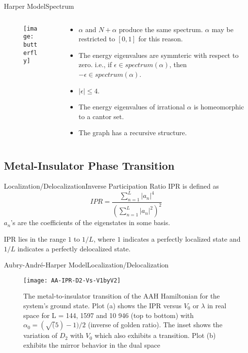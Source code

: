 \documentclass{beamer}
\begin{document}
\begin{frame}{Harper Model}{Spectrum}
\begin{columns}
 \begin{column}{0.35\textwidth}
  \begin{figure}[h]
    \centering
    \texttt{[image: butterfly]}
  \end{figure} 
 \end{column}
 \begin{column}{0.65\textwidth}
  \begin{itemize}\small
  \item $\alpha$ and $N+\alpha$ produce the same spectrum. $\alpha$ may be restricted to $[0,1]$ for this reason.
  \item The energy eigenvalues are symmteric with respect to zero. i.e., if $\epsilon \in spectrum(\alpha)$, then $-\epsilon \in spectrum(\alpha)$.
  \item $|\epsilon| \leq 4$.
  \item The energy eigenvalues of irrational $\alpha$ is homeomorphic to a cantor set.
  \item The graph has a recursive structure.
 \end{itemize}\normalsize
 \end{column}
\end{columns}
\end{frame}

\subsection{Metal-Insulator Phase Transition}
\begin{frame}{Localization/Delocalization}{Inverse Participation Ratio}
 \alert{IPR} is defined as
 \begin{equation}
 IPR = \frac{\sum_{n=1}^{L} |a_{n}|^4} {(\sum_{n=1}^{L} |a_{n}|^2)^2}
\end{equation}
$a_n$'s are the coefficients of the eigenstates in some basis.

IPR lies in the range $1$ to $1/L$, where $1$ indicates a perfectly localized state and $1/L$ indicates a perfectly delocalized state.
\end{frame}

\begin{frame}{Aubry-Andr\'e-Harper Model}{Localization/Delocalization}
 \begin{figure}[h]
\caption{\tiny The metal-to-insulator transition of the
AAH Hamiltonian for the system’s ground state. Plot (a) shows the
IPR versus $V_0$ or $\lambda$ in real space for L = 144, 1597 and 10 946 (top to
bottom) with $\alpha_0 = (\sqrt(5)-1)/2$ (inverse of golden ratio). The inset shows the variation of $D_2$ with $V_0$ which also
exhibits a transition. Plot (b) exhibits the mirror behavior in the dual
space\normalsize}
\texttt{[image: AA-IPR-D2-Vs-V1byV2]}
\centering
\end{figure}
\end{frame}
\end{document}
